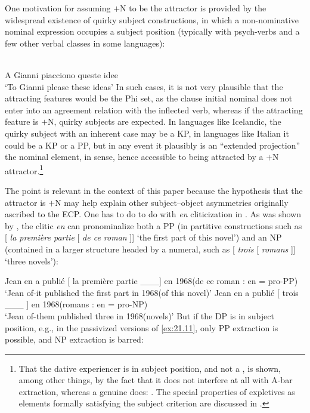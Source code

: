 \documentclass[output=paper]{langsci/langscibook}
\begin{document}
\begin{exe}
One motivation for assuming $+$N to be the attractor is provided by the
wide\-spread existence of quirky subject constructions, in which a non-nominative
nominal expression occupies a subject position (typically with psych-verbs and
a few other verbal classes in some languages):

\ea%
    \label{ex:21.10}\\
    A Gianni    piacciono   queste idee\\
    ‘To Gianni  please        these ideas’
\z
%
In such cases, it is not very plausible that the attracting features would be
the Phi set, as the clause initial nominal does not enter into an agreement
relation with the inflected verb, whereas if the attracting feature is $+$N,
quirky subjects are expected. In languages like Icelandic, the quirky subject
with an inherent case may be a KP, in languages like
Italian it could be a KP or a PP, but in any event it plausibly is an “extended
projection” the nominal element, in  sense, hence
accessible to being attracted by a $+$N attractor.\footnote{That the
    dative experiencer is in subject position, and not a
    , is shown, among other things, by the fact that it does not
    interfere at all with A-bar extraction, whereas a genuine  does:
    \citealt{Calabrese1986,BellettiRizzi1988}. The special properties of
    expletives as elements formally satisfying the subject criterion are
    discussed in \citet{RizziShlonsky2007}.}

The point is relevant in the context of this paper because the hypothesis that
the attractor is $+$N may help explain other subject--object asymmetries
originally ascribed to the ECP.  One has to do to do with \emph{en}
cliticization in . As was shown by \citet{Ruwet1972}, the clitic
\emph{en} can pronominalize both a PP (in partitive constructions such as [
\emph{la première partie} [ \emph{de ce roman} ]] ‘the first part of
this novel’) and an NP (contained in a larger structure headed by a numeral,
such as [ \emph{trois} [ \emph{romans} ]] ‘three novels’):

\ea%
    \label{ex:21.11}
    \ea Jean  en a publié [ la première partie \_\_\_] en 1968\hfill (de ce roman : en = pro-PP)\\
        ‘Jean of-it published the first part in 1968\hfill (of this novel)’
    \ex Jean  en a publié [ trois \_\_\_ ] en 1968\hfill (romans : en = pro-NP)\\
        ‘Jean of-them published three in 1968\hfill (novels)’
    \z
\z
%
But if the DP is in subject position, e.g., in the passivized versions of
\eqref{ex:21.11}, only PP extraction is possible, and NP extraction is
barred:\largerpage[-2]


\end{exe}
\end{document}
